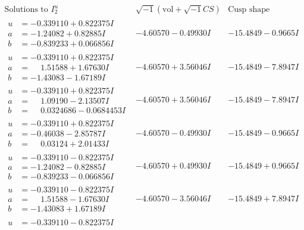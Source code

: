 \documentclass[1p]{elsarticle_modified}
\theoremstyle{definition}
\newcommand{\I}{\sqrt{-1}}
\begin{document}
$$\begin{array}{c|c|c}  
\text{Solutions to }I^u_{2}& \I (\text{vol} + \sqrt{-1}CS) & \text{Cusp shape}\\
 \hline 
\begin{aligned}
u &= -0.339110 + 0.822375 I \\
a &= -1.24082 + 0.82885 I \\
b &= -0.839233 + 0.066856 I\end{aligned}
 & -4.60570 - 0.49930 I & -15.4849 - 0.9665 I \\ \hline\begin{aligned}
u &= -0.339110 + 0.822375 I \\
a &= \phantom{-}1.51588 + 1.67630 I \\
b &= -1.43083 - 1.67189 I\end{aligned}
 & -4.60570 + 3.56046 I & -15.4849 - 7.8947 I \\ \hline\begin{aligned}
u &= -0.339110 + 0.822375 I \\
a &= \phantom{-}1.09190 - 2.13507 I \\
b &= \phantom{-}0.0324686 - 0.0684453 I\end{aligned}
 & -4.60570 + 3.56046 I & -15.4849 - 7.8947 I \\ \hline\begin{aligned}
u &= -0.339110 + 0.822375 I \\
a &= -0.46038 - 2.85787 I \\
b &= \phantom{-}0.03124 + 2.01433 I\end{aligned}
 & -4.60570 - 0.49930 I & -15.4849 - 0.9665 I \\ \hline\begin{aligned}
u &= -0.339110 - 0.822375 I \\
a &= -1.24082 - 0.82885 I \\
b &= -0.839233 - 0.066856 I\end{aligned}
 & -4.60570 + 0.49930 I & -15.4849 + 0.9665 I \\ \hline\begin{aligned}
u &= -0.339110 - 0.822375 I \\
a &= \phantom{-}1.51588 - 1.67630 I \\
b &= -1.43083 + 1.67189 I\end{aligned}
 & -4.60570 - 3.56046 I & -15.4849 + 7.8947 I \\ \hline\begin{aligned}
u &= -0.339110 - 0.822375 I \\

\end{aligned}
\end{array}$$
\end{document}
